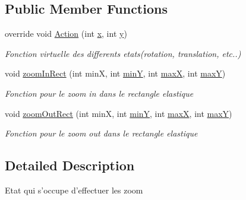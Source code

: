 \subsection*{Public Member Functions}
\begin{DoxyCompactItemize}
\item 
override void \hyperlink{class_interface_graphique_1_1patron__state_1_1_zoom_state_aa4608434efc2a14431b08ba9ba071633}{Action} (int \hyperlink{group__inf2990_ga6150e0515f7202e2fb518f7206ed97dc}{x}, int \hyperlink{group__inf2990_ga0a2f84ed7838f07779ae24c5a9086d33}{y})
\begin{DoxyCompactList}\small\item\em Fonction virtuelle des differents etats(rotation, translation, etc..) \end{DoxyCompactList}\item 
void \hyperlink{class_interface_graphique_1_1patron__state_1_1_zoom_state_af8c68a2ab6017ed82282ab98539e0e2c}{zoom\-In\-Rect} (int min\-X, int \hyperlink{group__inf2990_gacaa234d01574a8d00c2c39f7cdc1b6bf}{min\-Y}, int \hyperlink{group__inf2990_gaae341ebb372cc279ff44d3ebff2332f7}{max\-X}, int \hyperlink{group__inf2990_ga55923b57d480f3d35ec6619c8566851d}{max\-Y})
\begin{DoxyCompactList}\small\item\em Fonction pour le zoom in dans le rectangle elastique \end{DoxyCompactList}\item 
void \hyperlink{class_interface_graphique_1_1patron__state_1_1_zoom_state_a5440f88223701a602cfd54a22f61ee67}{zoom\-Out\-Rect} (int min\-X, int \hyperlink{group__inf2990_gacaa234d01574a8d00c2c39f7cdc1b6bf}{min\-Y}, int \hyperlink{group__inf2990_gaae341ebb372cc279ff44d3ebff2332f7}{max\-X}, int \hyperlink{group__inf2990_ga55923b57d480f3d35ec6619c8566851d}{max\-Y})
\begin{DoxyCompactList}\small\item\em Fonction pour le zoom out dans le rectangle elastique \end{DoxyCompactList}\end{DoxyCompactItemize}


\subsection{Detailed Description}
Etat qui s'occupe d'effectuer les zoom 



